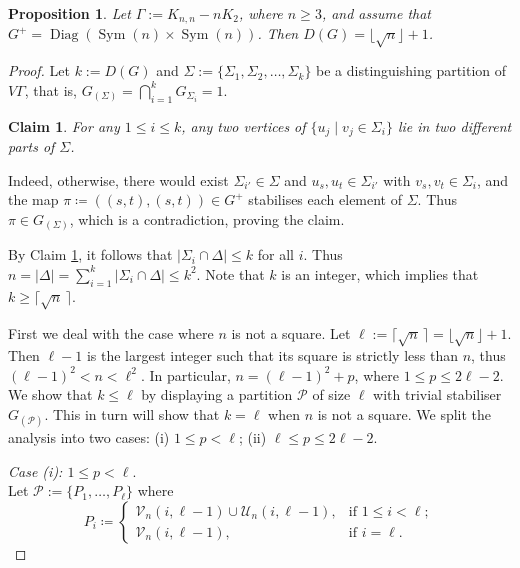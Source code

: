 \documentclass[11pt]{amsart}
\newtheorem{claim}{Claim}
\newtheorem{proposition}[theorem]{Proposition}
\DeclareMathOperator{\Sym}{Sym}
\DeclareMathOperator{\Aut}{Aut}
\DeclareMathOperator{\Diag}{Diag}
\begin{document}
\begin{proposition}\label{prop:DGdiag-Sym}
    Let \(\Gamma:=K_{n,n}-n K_2\), where $n\geqslant 3$, and assume that $G^+=\Diag(\Sym(n)\times \Sym(n))$.
    Then \(D(G)=\lfloor \sqrt{n}\rfloor+1\).
\end{proposition} 
\begin{proof}
 
Let \(k:=D(G)\) and $\Sigma:=\{\Sigma_1 , \Sigma_2, \ldots,\Sigma_k\}$  be a distinguishing  partition of \(V\Gamma\), that is, \(G_{(\Sigma)}=\bigcap_{i=1}^{k}G_{\Sigma_{i}}=1\).
\begin{claim}\label{u_idiffparts}
For any \(1\leqslant i\leqslant  k\), any two vertices of \(\{u_j \mid v_j\in \Sigma_i\}\) lie in two different parts of \(\Sigma\).
\end{claim}
Indeed, otherwise, there would exist \(\Sigma_{i'}\in\Sigma\) and \(u_s, u_t\in \Sigma_{i'}\) with \(v_s,v_t\in \Sigma_i\), and the map \(\pi\coloneqq ((s,t),(s,t))\in G^+\) stabilises each element of  \(\Sigma\).
Thus \(\pi\in G_{(\Sigma)}\), which is a contradiction, proving the claim.

By Claim \ref{u_idiffparts}, it follows that \(|\Sigma_{i}\cap \Delta|\leqslant k\) for all \(i\).
Thus \(n=|\Delta|=\sum_{i=1}^{k}|\Sigma_{i}\cap\Delta|\leqslant k^{2}\).
Note that \(k\) is an integer, which implies that \(k\geqslant \lceil\sqrt{n}\,\rceil.\)



First we deal with the case where \(n\) is not a square. 
Let \(\ell:=\lceil\sqrt{n}\,\rceil=\lfloor \sqrt{n}\rfloor+1\).
Then \(\ell-1\) is the largest integer such that its square is strictly less than \(n\),
thus \((\ell-1)^{2} < n < \ell^2\).
In particular, \(n=(\ell-1)^{2}+p\), where \(1 \leqslant p \leqslant 2\ell-2\).  We show that \(k\leqslant \ell\) by displaying a partition \(\mathcal{P}\) of size \(\ell\) with trivial stabiliser \(G_{(\mathcal{P})}\). This in turn will show that \(k=\ell\) when \(n\) is not a square.
We split the analysis into two cases: (i) \(1 \leqslant p< \ell\); (ii) \(\ell \leqslant p \leqslant 2\ell-2\).


 \medskip\noindent
\emph{Case (i):  \(1 \leqslant p< \ell\)}. \\Let \(\mathcal{P}:=\{P_{1},\ldots, P_{\ell}\}\) where
\begin{equation*} 
P_{i}  \coloneqq
\begin{cases}
   \mathcal{V}_n(i,\ell-1) \cup \mathcal{U}_n(i,\ell-1),& \text{if } 1\leqslant i < \ell;\\ 
   \mathcal{V}_n(i,\ell-1), & \text{if } i=\ell.
\end{cases}
\end{equation*}


\end{proof}
\end{document}
